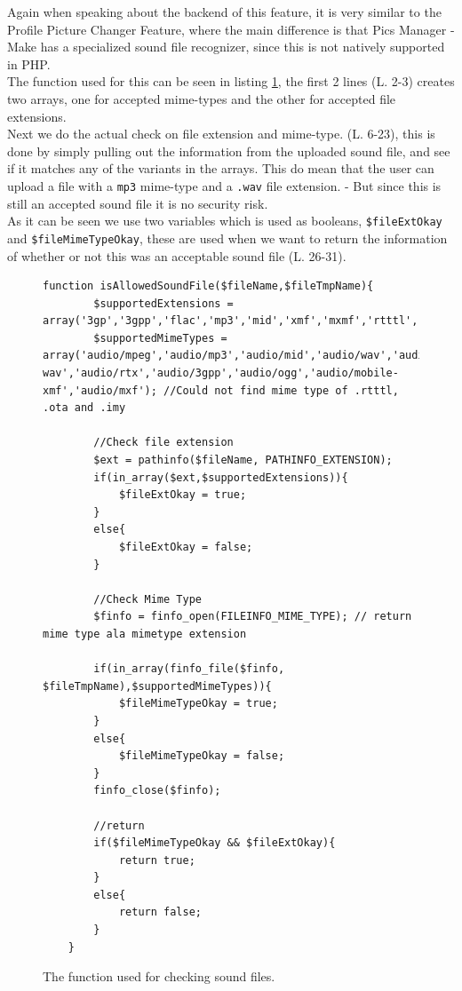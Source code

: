 Again when speaking about the backend of this feature, it is very similar to the Profile Picture Changer Feature, where the main difference is that Pics Manager - Make has a specialized sound file recognizer, since this is not natively supported in PHP.\\
The function used for this can be seen in listing \ref{lst:soundFileRecognizer}, the first 2 lines (L. 2-3) creates two arrays, one for accepted mime-types and the other for accepted file extensions.\\
Next we do the actual check on file extension and mime-type. (L. 6-23), this is done by simply pulling out the information from the uploaded sound file, and see if it matches any of the variants in the arrays. This do mean that the user can upload a file with a \texttt{mp3} mime-type and a \texttt{.wav} file extension. - But since this is still an accepted sound file it is no security risk.\\
As it can be seen we use two variables which is used as booleans, \texttt{\$fileExtOkay} and \texttt{\$fileMimeTypeOkay}, these are used when we want to return the information of whether or not this was an acceptable sound file (L. 26-31).

\lstset{language=PHP}
\begin{figure}[htbp]
\begin{lstlisting}[firstline=1]
	function isAllowedSoundFile($fileName,$fileTmpName){
		$supportedExtensions = array('3gp','3gpp','flac','mp3','mid','xmf','mxmf','rtttl','rtx','ota','imy','ogg','wav');
		$supportedMimeTypes = array('audio/mpeg','audio/mp3','audio/mid','audio/wav','audio/x-wav','audio/rtx','audio/3gpp','audio/ogg','audio/mobile-xmf','audio/mxf'); //Could not find mime type of .rtttl, .ota and .imy
		
		//Check file extension
		$ext = pathinfo($fileName, PATHINFO_EXTENSION);
		if(in_array($ext,$supportedExtensions)){
			$fileExtOkay = true;
		}
		else{
			$fileExtOkay = false;
		}
		
		//Check Mime Type
		$finfo = finfo_open(FILEINFO_MIME_TYPE); // return mime type ala mimetype extension
		
		if(in_array(finfo_file($finfo, $fileTmpName),$supportedMimeTypes)){
			$fileMimeTypeOkay = true;
		}
		else{
			$fileMimeTypeOkay = false;
		}
		finfo_close($finfo);
		
		//return
		if($fileMimeTypeOkay && $fileExtOkay){
			return true;
		}
		else{
			return false;
		}
	}
\end{lstlisting}
\caption{The function used for checking sound files.}
\label{lst:soundFileRecognizer}
\end{figure}

